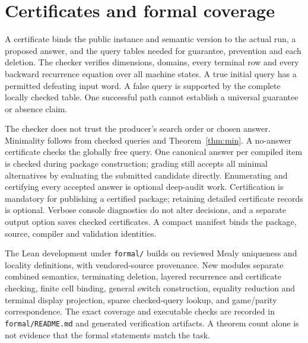 \documentclass[11pt]{article}
\begin{document}
\section{Certificates and formal coverage}
A certificate binds the public instance and semantic version to the actual run,
a proposed answer, and the query tables needed for guarantee, prevention and
each deletion. The checker verifies dimensions, domains, every terminal row
and every backward recurrence equation over all machine states.
A true initial query has a permitted defeating input word.
A false query is supported by the complete locally checked table.
One successful path cannot establish a universal guarantee or absence claim.

The checker does not trust the producer's search order or chosen answer.
Minimality follows from checked queries and Theorem~\ref{thm:min}.
A no-answer certificate checks the globally free query.
One canonical answer per compiled item is checked during package construction;
grading still accepts all minimal alternatives by evaluating the submitted
candidate directly. Enumerating and certifying every accepted answer is optional
deep-audit work. Certification is mandatory for publishing a certified package;
retaining detailed certificate records is optional. Verbose console diagnostics
do not alter decisions, and a separate output option saves checked certificates.
A compact manifest binds the package, source, compiler and validation identities.

The Lean development under \texttt{formal/} builds on reviewed Mealy uniqueness
and locality definitions, with vendored-source provenance. New modules separate
combined semantics, terminating deletion, layered recurrence and certificate
checking, finite cell binding, general switch construction, equality reduction
and terminal display projection,
sparse checked-query lookup, and game/parity correspondence. The exact
coverage and executable checks are recorded in \texttt{formal/README.md}
and generated verification artifacts. A theorem count alone is not evidence
that the formal statements match the task.
\end{document}
